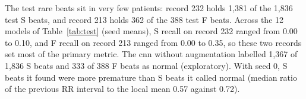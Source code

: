 The test rare beats sit in very few patients: record 232 holds 1,381 of the 1,836 test S beats, and record 213 holds 362 of the 388 test F beats. Across the 12 models of Table~\ref{tab:test} (seed means), S recall on record 232 ranged from 0.00 to 0.10, and F recall on record 213 ranged from 0.00 to 0.35, so these two records set most of the primary metric. The cnn without augmentation labelled 1,367 of 1,836 S beats and 333 of 388 F beats as normal (exploratory). With seed 0, S beats it found were more premature than S beats it called normal (median ratio of the previous RR interval to the local mean 0.57 against 0.72).
